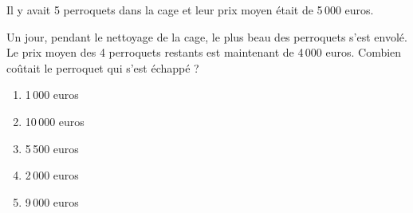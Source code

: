 Il y avait 5 perroquets dans la cage et leur prix moyen était de 5\,000 euros.
\par Un jour, pendant le nettoyage de la cage, le plus beau des perroquets s'est envolé. Le prix moyen des 4 perroquets restants est maintenant de 4\,000 euros. Combien coûtait le perroquet qui s'est échappé ?
\begin{multicols}{5}
  \begin{enumerate}[A/]
  \item 1\,000 euros
  \item 10\,000 euros
  \item 5\,500 euros
  \item 2\,000 euros
  \item 9\,000 euros
  \end{enumerate}
\end{multicols}